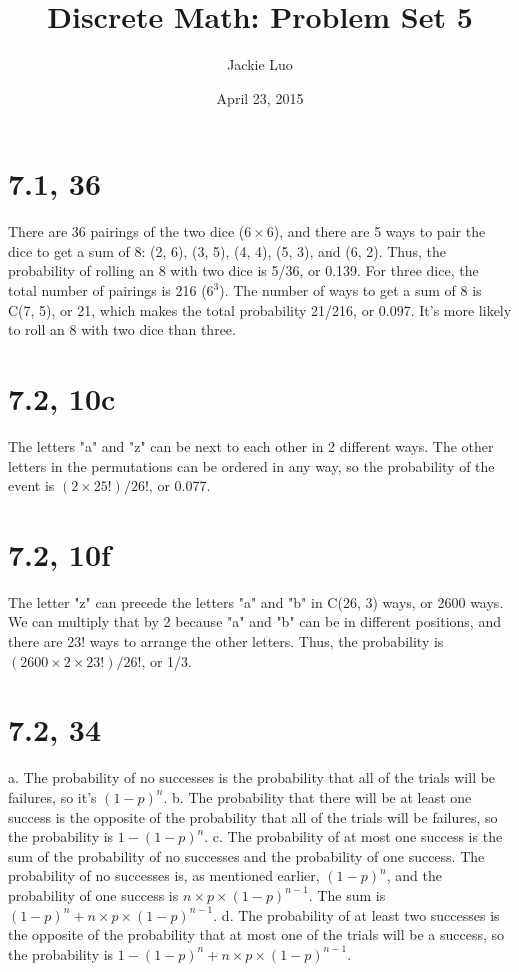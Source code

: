 \documentclass{article}
\title{Discrete Math: Problem Set 5}
\author{Jackie Luo}
\date{April 23, 2015}
\begin{document}
\maketitle

\section{7.1, 36}
There are 36 pairings of the two dice ($6 \times 6$), and there are 5 ways to pair the dice to get a sum of 8: (2, 6), (3, 5), (4, 4), (5, 3), and (6, 2). Thus, the probability of rolling an 8 with two dice is 5/36, or 0.139. For three dice, the total number of pairings is 216 ($6^3$). The number of ways to get a sum of 8 is C(7, 5), or 21, which makes the total probability 21/216, or 0.097. It's more likely to roll an 8 with two dice than three.

\section{7.2, 10c}
The letters "a" and "z" can be next to each other in 2 different ways. The other letters in the permutations can be ordered in any way, so the probability of the event is $(2 \times 25!)/26!$, or 0.077.

\section{7.2, 10f}
The letter "z" can precede the letters "a" and "b" in C(26, 3) ways, or 2600 ways. We can multiply that by 2 because "a" and "b" can be in different positions, and there are 23! ways to arrange the other letters. Thus, the probability is $(2600 \times 2 \times 23!)/26!$, or 1/3.

\section{7.2, 34}
a. The probability of no successes is the probability that all of the trials will be failures, so it's $(1 - p)^n$.
\newline
b. The probability that there will be at least one success is the opposite of the probability that all of the trials will be failures, so the probability is $1 - (1 - p)^n$.
\newline
c. The probability of at most one success is the sum of the probability of no successes and the probability of one success. The probability of no successes is, as mentioned earlier, $(1 - p)^n$, and the probability of one success is $n \times p \times (1 - p)^{n - 1}$. The sum is $(1 - p)^n + n \times p \times (1 - p)^{n - 1}$.
\newline
d. The probability of at least two successes is the opposite of the probability that at most one of the trials will be a success, so the probability is $1 - (1 - p)^n + n \times p \times (1 - p)^{n - 1}$.
\end{document}
